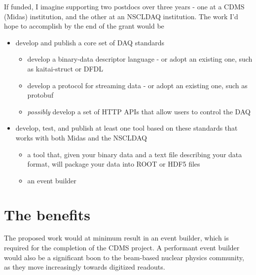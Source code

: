 \documentclass[]{report}   %
\begin{document}
If funded, I imagine supporting two postdocs over three years - one at a CDMS (Midas) institution, and the other at an NSCLDAQ institution.  The work I'd hope to accomplish by the end of the grant would be
\begin{itemize}
 \item develop and publish a core set of DAQ standards
 \begin{itemize}
   \item develop a binary-data descriptor language - or adopt an existing one, such as kaitai-struct or DFDL
   \item develop a protocol for streaming data - or adopt an existing one, such as protobuf
   \item \emph{possibly} develop a set of HTTP APIs that allow users to control the DAQ
 \end{itemize}

 \item develop, test, and publish at least one tool based on these standards that works with both Midas and the NSCLDAQ 
 \begin{itemize}
   \item a tool that, given your binary data and a text file describing your data format, will package your data into ROOT or HDF5 files
   \item an event builder
 \end{itemize}

\end{itemize}


\section*{The benefits}
The proposed work would at minimum result in an event builder, which is required for the completion of the CDMS project.  A performant event builder would also be a significant boon to the beam-based nuclear physics community, as they move increasingly towards digitized readouts.  
\end{document}
